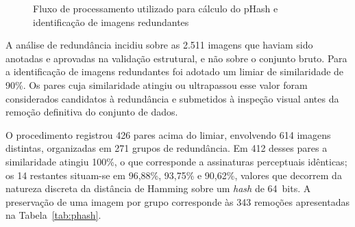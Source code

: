 \documentclass[artigo,times,capa]{iftex2024}
\begin{document}
\begin{figure}[H]
\centering
\caption{Fluxo de processamento utilizado para cálculo do pHash e identificação de imagens redundantes}
\label{fig:fluxo_phash}


\end{figure}

A análise de redundância incidiu sobre as 2.511 imagens que haviam sido anotadas e aprovadas na validação estrutural, e não sobre o conjunto bruto. Para a identificação de imagens redundantes foi adotado um limiar de similaridade de 90\%. Os pares cuja similaridade atingiu ou ultrapassou esse valor foram considerados candidatos à redundância e submetidos à inspeção visual antes da remoção definitiva do conjunto de dados.

O procedimento registrou 426 pares acima do limiar, envolvendo 614 imagens distintas, organizadas em 271 grupos de redundância. Em 412 desses pares a similaridade atingiu 100\%, o que corresponde a assinaturas perceptuais idênticas; os 14 restantes situam-se em 96,88\%, 93,75\% e 90,62\%, valores que decorrem da natureza discreta da distância de Hamming sobre um \textit{hash} de 64~bits. A preservação de uma imagem por grupo corresponde às 343 remoções apresentadas na Tabela~\ref{tab:phash}.
\end{document}
